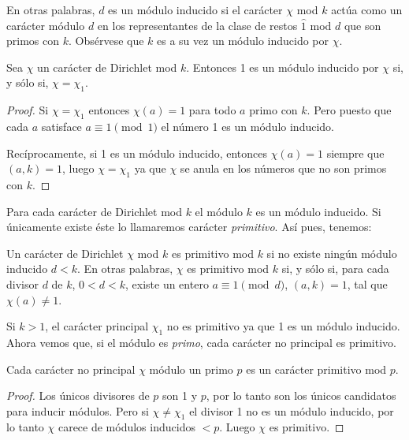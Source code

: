 \documentclass[12pt,a4paper]{book}
\begin{document}
    En otras palabras, $d$ es un módulo inducido si el carácter $\chi$ mod $k$ actúa como un
    carácter módulo $d$ en los representantes de la clase de restos $\hat{1}$ mod $d$ que
    son primos con $k$. Obsérvese que $k$ es a su vez un módulo inducido por $\chi$.

    \begin{teorema}
        Sea $\chi$ un carácter de Dirichlet mod $k$. Entonces 1 es un módulo inducido por
        $\chi$ si, y sólo si, $\chi=\chi_{1}$.
    \end{teorema}

    \begin{proof}
        Si $\chi=\chi_{1}$ entonces $\chi(a)=1$ para todo $a$ primo con $k$. Pero puesto que
        cada $a$ satisface $a\equiv1\pmod{1}$ el número 1 es un módulo inducido.

        Recíprocamente, si 1 es un módulo inducido, entonces $\chi(a)=1$ siempre que
        $(a,k)=1$, luego $\chi=\chi_{1}$ ya que $\chi$ se anula en los números que no son
        primos con $k$.
    \end{proof}

    Para cada carácter de Dirichlet mod $k$ el módulo $k$ es un módulo inducido. Si
    únicamente existe éste lo llamaremos carácter \textit{primitivo}. Así pues, tenemos:

    \begin{definicion}
        Un carácter de Dirichlet $\chi$ mod $k$ es primitivo mod $k$ si no existe ningún
        módulo inducido $d<k$. En otras palabras, $\chi$ es primitivo mod $k$ si, y sólo si,
        para cada divisor $d$ de $k$, $0<d<k$, existe un entero $a\equiv1\pmod{d}$,
        $(a,k)=1$, tal que $\chi(a)\neq1$.
    \end{definicion}

    Si $k>1$, el carácter principal $\chi_{1}$ no es primitivo ya que 1 es un módulo inducido.
    Ahora vemos que, si el módulo es \textit{primo}, cada carácter no principal es
    primitivo.

    \begin{teorema}
        Cada carácter no principal $\chi$ módulo un primo $p$ es un carácter primitivo
        mod $p$.
    \end{teorema}

    \begin{proof}
        Los únicos divisores de $p$ son 1 y $p$, por lo tanto son los únicos candidatos para
        inducir módulos. Pero si $\chi\neq\chi_{1}$ el divisor 1 no es un módulo inducido, por
        lo tanto $\chi$ carece de módulos inducidos $<p$. Luego $\chi$ es primitivo.
    \end{proof}
\end{document}
